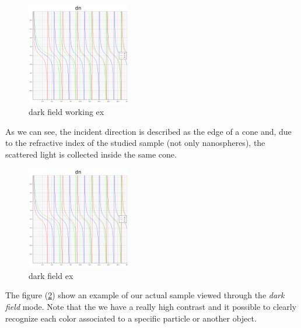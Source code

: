 \documentclass{article}
\numberwithin{equation}{section}
\begin{document}
\begin{figure}[h]
    \centering
    \includegraphics[width=0.4\textwidth, height=0.35\textwidth]{dn.png}
    \caption{dark field working ex}
    \label{fig:dark_field_working_ex}
\end{figure}
As we can see, the incident direction is described as the edge of a cone and, due to the refractive index of the studied sample (not only nanospheres), the scattered light is collected inside the same cone.
\begin{figure}[h]
    \centering
    \includegraphics[width=0.4\textwidth, height=0.35\textwidth]{dn.png}
    \caption{dark field ex}
    \label{fig:dark_field_ex}
\end{figure}
The figure (\ref{fig:dark_field_ex}) show an example of our actual sample viewed through the \textit{dark field} mode. Note that the we have a really high contrast and it possible to clearly recognize each color associated to a specific particle or another object.
\end{document}
